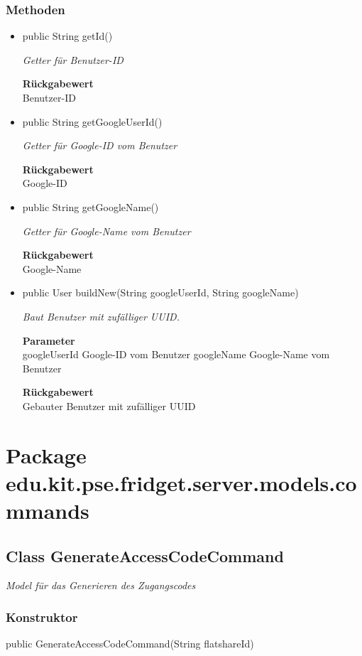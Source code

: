 \documentclass[a4paper]{scrreprt}
\begin{document}
    \subsubsection{Methoden}
    \begin{itemize}
    	\item{public String getId()}
    	
    	\textit{Getter für Benutzer-ID}
    	
    	
    	
    	\textbf{Rückgabewert} \\
    	Benutzer-ID        \item{public String getGoogleUserId()}
    	
    	\textit{Getter für Google-ID vom Benutzer}
    	
    	
    	
    	\textbf{Rückgabewert} \\
    	Google-ID        \item{public String getGoogleName()}
    	
    	\textit{Getter für Google-Name vom Benutzer}
    	
    	
    	
    	\textbf{Rückgabewert} \\
    	Google-Name        \item{public User buildNew(String googleUserId, String googleName)}
    	
    	\textit{Baut Benutzer mit zufälliger UUID.}
    	
    	\textbf{Parameter} \\
    	googleUserId Google-ID vom Benutzer
    	googleName Google-Name vom Benutzer
    	
    	\textbf{Rückgabewert} \\
    	Gebauter Benutzer mit zufälliger UUID
    \end{itemize}
    \section{Package edu.kit.pse.fridget.server.models.commands}
    \subsection{Class GenerateAccessCodeCommand}
    \textit{Model für das Generieren des Zugangscodes}
    \subsubsection{Konstruktor}
    public GenerateAccessCodeCommand(String flatshareId)
\end{document}
